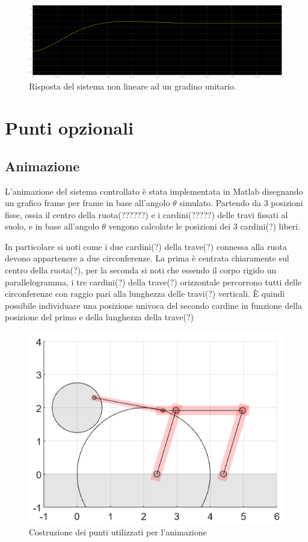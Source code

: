 \documentclass[a4paper, 11pt]{article}
\begin{document}
\begin{figure}[h!]
	\centering
	\includegraphics[width=0.75\linewidth]{./images/stepRespNonLinUni.png}
	\caption{Risposta del sistema non lineare ad un gradino unitario.}
	\label{fig:step_response_non_lin_uni}
\end{figure}

\section{Punti opzionali}

\subsection{Animazione}

L'animazione del sistema controllato è stata implementata in Matlab disegnando un grafico frame per frame in base all'angolo $\theta$ simulato.
Partendo da 3 posizioni fisse, ossia il centro della ruota(??????) e i cardini(?????) delle travi fissati al suolo, e in base all'angolo $\theta$ vengono calcolate le posizioni dei 3 cardini(?) liberi.

In particolare si noti come i due cardini(?) della trave(?) connessa alla ruota devono appartenere a due circonferenze. La prima è centrata chiaramente sul centro della ruota(?), per la seconda si noti che essendo il corpo rigido un parallelogramma, i tre cardini(?) della trave(?) orizzontale percorrono tutti delle circonferenze con raggio pari alla lunghezza delle travi(?) verticali. È quindi possibile individuare una posizione univoca del secondo cardine in funzione della posizione del primo e della lunghezza della trave(?)

\begin{figure}[h!]
	\centering
	\includegraphics[width=0.4\linewidth]{./images/animazione_costruzione.png}
	\caption{Costruzione dei punti utilizzati per l'animazione}
	\label{fig:animazione_costruzione}
\end{figure}
\end{document}
